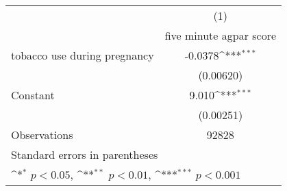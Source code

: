 {
\def\sym#1{\ifmmode^{#1}\else\(^{#1}\)\fi}
\begin{tabular}{l*{1}{c}}
\hline\hline
                    &\multicolumn{1}{c}{(1)}\\
                    &\multicolumn{1}{c}{five minute agpar score}\\
\hline
tobacco use during pregnancy&     -0.0378\sym{***}\\
                    &   (0.00620)         \\
[1em]
Constant            &       9.010\sym{***}\\
                    &   (0.00251)         \\
\hline
Observations        &       92828         \\
\hline\hline
\multicolumn{2}{l}{\footnotesize Standard errors in parentheses}\\
\multicolumn{2}{l}{\footnotesize \sym{*} \(p<0.05\), \sym{**} \(p<0.01\), \sym{***} \(p<0.001\)}\\
\end{tabular}
}
